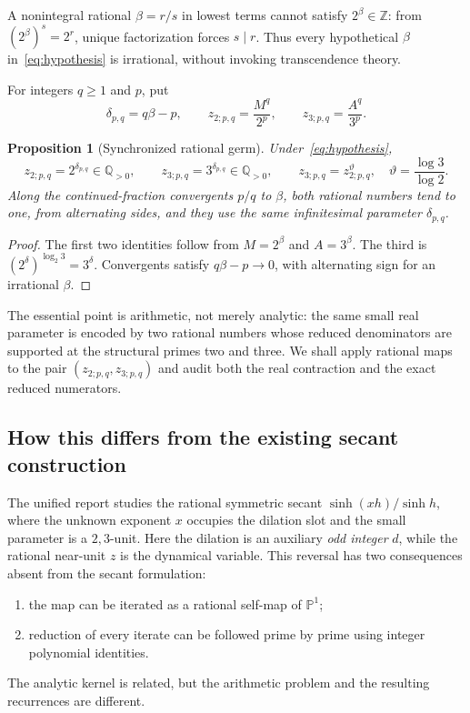 \documentclass[11pt,oneside]{article}
\newtheorem{proposition}[theorem]{Proposition}
\theoremstyle{definition}
\theoremstyle{remark}
\newcommand{\Z}{\mathbb Z}
\newcommand{\Q}{\mathbb Q}
\newcommand{\thetaAE}{\vartheta}
\begin{document}
A nonintegral rational \(\beta=r/s\) in lowest terms cannot satisfy
\(2^\beta\in\Z\): from \((2^\beta)^s=2^r\), unique factorization forces \(s\mid r\).
Thus every hypothetical \(\beta\) in~\eqref{eq:hypothesis} is irrational, without invoking
transcendence theory.

For integers \(q\ge1\) and \(p\), put
\begin{equation}
 \delta_{p,q}=q\beta-p,
 \qquad z_{2;p,q}=\frac{M^q}{2^p},
 \qquad z_{3;p,q}=\frac{A^q}{3^p}.
 \label{eq:synchronized-germ}
\end{equation}

\begin{proposition}[Synchronized rational germ]
\label{prop:germ}
Under~\eqref{eq:hypothesis},
\begin{equation}
 z_{2;p,q}=2^{\delta_{p,q}}\in\Q_{>0},\qquad
 z_{3;p,q}=3^{\delta_{p,q}}\in\Q_{>0},\qquad
 z_{3;p,q}=z_{2;p,q}^{\thetaAE},
 \quad \thetaAE=\frac{\log3}{\log2}.
 \label{eq:germ-relations}
\end{equation}
Along the continued-fraction convergents \(p/q\) to \(\beta\), both rational numbers tend to
one, from alternating sides, and they use the same infinitesimal parameter \(\delta_{p,q}\).
\end{proposition}

\begin{proof}
The first two identities follow from \(M=2^\beta\) and \(A=3^\beta\).  The third is
\((2^\delta)^{\log_2 3}=3^\delta\).  Convergents satisfy
\(q\beta-p\to0\), with alternating sign for an irrational \(\beta\).
\end{proof}

The essential point is arithmetic, not merely analytic: the same small real parameter is
encoded by two rational numbers whose reduced denominators are supported at the structural
primes two and three.  We shall apply rational maps to the pair
\((z_{2;p,q},z_{3;p,q})\) and audit both the real contraction and the exact reduced
numerators.

\subsection{How this differs from the existing secant construction}

The unified report studies the rational symmetric secant
\(\sinh(xh)/\sinh h\), where the unknown exponent \(x\) occupies the dilation slot and the
small parameter is a \(2,3\)-unit.  Here the dilation is an auxiliary \emph{odd integer}
\(d\), while the rational near-unit \(z\) is the dynamical variable.  This reversal has two
consequences absent from the secant formulation:
\begin{enumerate}
\item the map can be iterated as a rational self-map of \(\mathbb P^1\);
\item reduction of every iterate can be followed prime by prime using integer polynomial
identities.
\end{enumerate}
The analytic kernel is related, but the arithmetic problem and the resulting recurrences are
different.
\end{document}
